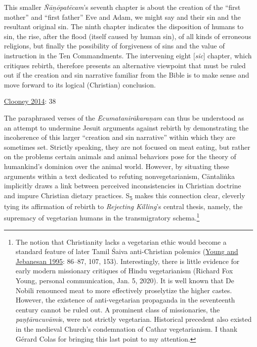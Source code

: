 \begin{pullquote}
This smaller \emph{{Ñāṉōpatēcam}}’s seventh chapter is about the creation of the “first mother” and “first father”  \Dash  Eve and Adam, we might say  \Dash  and their sin and the resultant original sin. The ninth chapter indicates the disposition of humans to sin, the rise, after the flood (itself caused by human sin), of all kinds of erroneous religions, but finally the possibility of forgiveness of sins and the value of instruction in the Ten Commandments. The intervening eight [\emph{sic}] chapter, which critiques rebirth, therefore presents an alternative viewpoint that must be ruled out if the creation and sin narrative familiar from the Bible is to make sense and move forward to its logical (Christian) conclusion.


\medskip\hfill\begin{minipage}{0.9\textwidth}\small\hfill
\hyperref[Clooney2014]{Clooney 2014}: 38\end{minipage}\hspace{2em}
\end{pullquote}

The paraphrased verses of the \emph{{Ēcumatanirākaraṇam}} can thus be understood as an attempt to undermine Jesuit arguments against rebirth by demonstrating the incoherence of this larger “creation and sin narrative” within which they are sometimes set. Strictly speaking, they are not focused on meat eating, but rather on the problems certain animals and animal behaviors pose for the theory of humankind’s dominion over the animal world. However, by situating these arguments within a text dedicated to refuting nonvegetarianism, Cāntaliṅka implicitly draws a link between perceived inconsistencies in Christian doctrine and impure Christian dietary practices. S\textsubscript{5} makes this connection clear, cleverly tying its affirmation of rebirth to \emph{Rejecting Killing}’s central thesis, namely, the supremacy of vegetarian humans in the transmigratory schema.\footnote{%
The notion that Christianity lacks a vegetarian ethic would become a standard feature of later Tamil Śaiva anti-Christian polemics (\hyperref[Young1995]{Young and Jebanesan 1995}: 86–87, 107, 153). Interestingly, there is little evidence for early modern missionary critiques of Hindu vegetarianism (Richard Fox Young, personal communication, Jan. 5, 2020). It is well known that De Nobili renounced meat to more effectively proselytize the higher castes. However, the existence of anti-vegetarian propaganda in the seventeenth century cannot be ruled out. A prominent class of missionaries, the \emph{paṇṭāracuvāmi}s, were not strictly vegetarian. Historical precedent also existed in the medieval Church’s condemnation of Cathar vegetarianism. I thank Gérard Colas for bringing this last point to my attention. 
}



